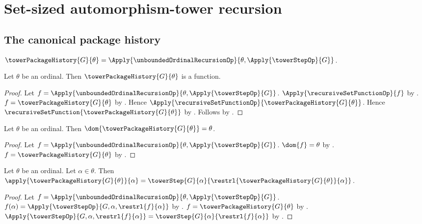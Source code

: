 \section{Set-sized automorphism-tower recursion}

\subsection{The canonical package history}

\begin{definition}\label{tower_package_history}
    $\towerPackageHistory{G}{\theta}=
        \Apply{\unboundedOrdinalRecursionOp}
            {\theta,\Apply{\towerStepOp}{G}}$.
\end{definition}

\begin{proposition}\label{tower_package_history_function}
    Let $\theta$ be an ordinal.
    Then $\towerPackageHistory{G}{\theta}$ is a function.
\end{proposition}
\begin{proof}
    Let $f=\Apply{\unboundedOrdinalRecursionOp}
        {\theta,\Apply{\towerStepOp}{G}}$.
    $\Apply{\recursiveSetFunctionOp}{f}$ by
        .
    $f=\towerPackageHistory{G}{\theta}$ by
        .
    Hence
        $\Apply{\recursiveSetFunctionOp}{\towerPackageHistory{G}{\theta}}$.
    Hence $\recursiveSetFunction{\towerPackageHistory{G}{\theta}}$ by
        .
    Follows by .
\end{proof}

\begin{proposition}\label{tower_package_history_domain}
    Let $\theta$ be an ordinal.
    Then $\dom{\towerPackageHistory{G}{\theta}}=\theta$.
\end{proposition}
\begin{proof}
    Let $f=\Apply{\unboundedOrdinalRecursionOp}
        {\theta,\Apply{\towerStepOp}{G}}$.
    $\dom{f}=\theta$ by
        .
    $f=\towerPackageHistory{G}{\theta}$ by
        .
\end{proof}

\begin{proposition}\label{tower_package_history_equation}
    Let $\theta$ be an ordinal.
    Let $\alpha\in\theta$.
    Then $\apply{\towerPackageHistory{G}{\theta}}{\alpha}=
        \towerStep{G}{\alpha}{
            \restrl{\towerPackageHistory{G}{\theta}}{\alpha}}$.
\end{proposition}
\begin{proof}
    Let $f=\Apply{\unboundedOrdinalRecursionOp}
        {\theta,\Apply{\towerStepOp}{G}}$.
    $f(\alpha)=
        \Apply{\towerStepOp}{G,\alpha,
            \restrl{f}{\alpha}}$ by
        .
    $f=\towerPackageHistory{G}{\theta}$ by
        .
    $\Apply{\towerStepOp}{G,\alpha,
            \restrl{f}{\alpha}}
        =\towerStep{G}{\alpha}{\restrl{f}{\alpha}}$ by
        .
\end{proof}


